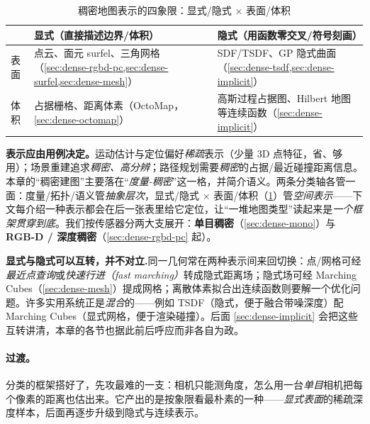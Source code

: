 \begin{table}[H]\centering\small
\caption{稠密地图表示的四象限：显式/隐式 $\times$ 表面/体积\cite{carlone2026handbook}}
\label{tab:dense-quadrant}
\begin{tabular}{p{} p{} p{}}
\toprule
 & 显式（直接描述边界/体积） & 隐式（用函数零交叉/符号刻画） \\
\midrule
表面 & 点云、面元 surfel、三角网格（\cref{sec:dense-rgbd-pc,sec:dense-surfel,sec:dense-mesh}） & SDF/TSDF、GP 隐式曲面（\cref{sec:dense-tsdf,sec:dense-implicit}） \\
体积 & 占据栅格、距离体素（OctoMap，\cref{sec:dense-octomap}） & 高斯过程占据图、Hilbert 地图等连续函数（\cref{sec:dense-implicit}） \\
\bottomrule
\end{tabular}
\end{table}

\begin{insight}
\textbf{表示应由用例决定。}运动估计与定位偏好\emph{稀疏}表示（少量 3D 点特征，省、够用）；场景重建追求\emph{稠密、高分辨}；路径规划需要\emph{稠密}的占据/最近碰撞距离信息\cite{carlone2026handbook}。本章的“稠密建图”主要落在“\emph{度量-稠密}”这一格，并简介语义。两条分类轴各管一面：度量/拓扑/语义管\emph{抽象层次}，显式/隐式 $\times$ 表面/体积（\cref{tab:dense-quadrant}）管\emph{空间表示}——下文每介绍一种表示都会在后一张表里给它定位，让“一堆地图类型”读起来是\emph{一个框架贯穿到底}。我们按传感器分两大支展开：\textbf{单目稠密}（\cref{sec:dense-mono}）与 \textbf{RGB-D / 深度稠密}（\cref{sec:dense-rgbd-pc} 起）。
\end{insight}

\begin{note}
\textbf{显式与隐式可以互转，并不对立.}\;同一几何常在两种表示间来回切换：点/网格可经\emph{最近点查询}或\emph{快速行进（fast marching）}转成隐式距离场；隐式场可经 Marching Cubes（\cref{sec:dense-mesh}）提成网格；离散体素拟合出连续函数则要解一个优化问题。许多实用系统正是\emph{混合}的——例如 TSDF（隐式，便于融合带噪深度）配 Marching Cubes（显式网格，便于渲染碰撞）。后面 \cref{sec:dense-implicit} 会把这些互转讲清，本章的各节也据此前后呼应而非各自为政。
\end{note}

\paragraph{过渡。}
分类的框架搭好了，先攻最难的一支：相机只能测角度，怎么用一台\emph{单目}相机把每个像素的距离也估出来。它产出的是按象限看最朴素的一种——\emph{显式表面}的稀疏深度样本，后面再逐步升级到隐式与连续表示。

